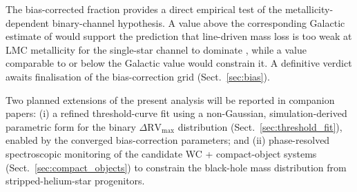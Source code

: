 The bias-corrected fraction \fbincorr provides a direct empirical test
of the metallicity-dependent binary-channel hypothesis. A value above
the corresponding Galactic estimate of \citet{Dsilva2023} would support
the prediction that line-driven mass loss is too weak at LMC
metallicity for the single-star channel to dominate
\citep{Shenar2020, Marchant2023}, while a value comparable to or below
the Galactic value would constrain it. A definitive verdict awaits
finalisation of the bias-correction grid (Sect.~\ref{sec:bias}).

Two planned extensions of the present analysis will be reported in
companion papers: (i) a refined threshold-curve fit using a
non-Gaussian, simulation-derived parametric form for the binary
$\Delta\mathrm{RV}_{\max}$ distribution
(Sect.~\ref{sec:threshold_fit}), enabled by the converged
bias-correction parameters; and (ii) phase-resolved spectroscopic
monitoring of the \NcandidateBH candidate WC + compact-object systems
(Sect.~\ref{sec:compact_objects}) to constrain the black-hole mass
distribution from stripped-helium-star progenitors.
